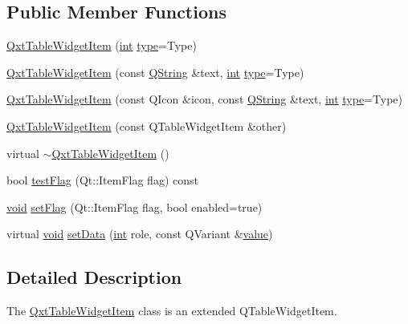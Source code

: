 \subsection*{Public Member Functions}
\begin{DoxyCompactItemize}
\item 
\hyperlink{class_qxt_table_widget_item_aee5b17f2051bf79a7b6897eeb10595c2}{Qxt\-Table\-Widget\-Item} (\hyperlink{ioapi_8h_a787fa3cf048117ba7123753c1e74fcd6}{int} \hyperlink{glext_8h_a7d05960f4f1c1b11f3177dc963a45d86}{type}=Type)
\item 
\hyperlink{class_qxt_table_widget_item_a8231601a8fd5fe074b15daad6803d372}{Qxt\-Table\-Widget\-Item} (const \hyperlink{group___u_a_v_objects_plugin_gab9d252f49c333c94a72f97ce3105a32d}{Q\-String} \&text, \hyperlink{ioapi_8h_a787fa3cf048117ba7123753c1e74fcd6}{int} \hyperlink{glext_8h_a7d05960f4f1c1b11f3177dc963a45d86}{type}=Type)
\item 
\hyperlink{class_qxt_table_widget_item_aee6bb08a6656db0c1611ed8b4bb105f7}{Qxt\-Table\-Widget\-Item} (const Q\-Icon \&icon, const \hyperlink{group___u_a_v_objects_plugin_gab9d252f49c333c94a72f97ce3105a32d}{Q\-String} \&text, \hyperlink{ioapi_8h_a787fa3cf048117ba7123753c1e74fcd6}{int} \hyperlink{glext_8h_a7d05960f4f1c1b11f3177dc963a45d86}{type}=Type)
\item 
\hyperlink{class_qxt_table_widget_item_a49918a9d4f05b6aca0a71a8dc8570f7e}{Qxt\-Table\-Widget\-Item} (const Q\-Table\-Widget\-Item \&other)
\item 
virtual \hyperlink{class_qxt_table_widget_item_a91d8a9e2a4a48e78a2cd4bb03bddad74}{$\sim$\-Qxt\-Table\-Widget\-Item} ()
\item 
bool \hyperlink{class_qxt_table_widget_item_a7b0a09ff7307f7e9172b3eb64070e375}{test\-Flag} (Qt\-::\-Item\-Flag flag) const 
\item 
\hyperlink{group___u_a_v_objects_plugin_ga444cf2ff3f0ecbe028adce838d373f5c}{void} \hyperlink{class_qxt_table_widget_item_a7ff4affc5325e76187052a2d34789f14}{set\-Flag} (Qt\-::\-Item\-Flag flag, bool enabled=true)
\item 
virtual \hyperlink{group___u_a_v_objects_plugin_ga444cf2ff3f0ecbe028adce838d373f5c}{void} \hyperlink{class_qxt_table_widget_item_a12cd3a8b8aff9e87c6e39a26eba6286c}{set\-Data} (\hyperlink{ioapi_8h_a787fa3cf048117ba7123753c1e74fcd6}{int} role, const Q\-Variant \&\hyperlink{glext_8h_aa0e2e9cea7f208d28acda0480144beb0}{value})
\end{DoxyCompactItemize}


\subsection{Detailed Description}
The \hyperlink{class_qxt_table_widget_item}{Qxt\-Table\-Widget\-Item} class is an extended Q\-Table\-Widget\-Item. 

